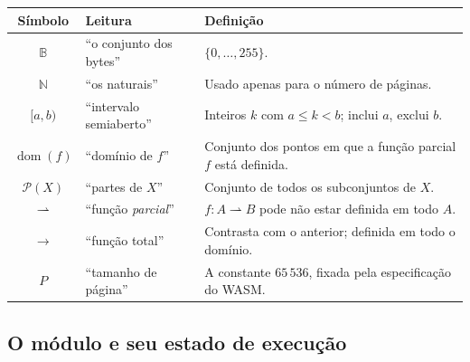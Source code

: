 \documentclass[11pt,a4paper]{article}
\theoremstyle{definition}
\begin{document}
\begin{tabularx}{\textwidth}{@{}c l X@{}}
\toprule
\textbf{Símbolo} & \textbf{Leitura} & \textbf{Definição} \\
\midrule
$\mathbb{B}$ & ``o conjunto dos bytes'' & $\{0,\dots,255\}$. \\
$\mathbb{N}$ & ``os naturais'' & Usado apenas para o número de páginas. \\
$[a,b)$ & ``intervalo semiaberto'' & Inteiros $k$ com $a \le k < b$; inclui $a$, exclui $b$. \\
$\operatorname{dom}(f)$ & ``domínio de $f$'' & Conjunto dos pontos em que a função parcial $f$ está definida. \\
$\mathcal{P}(X)$ & ``partes de $X$'' & Conjunto de todos os subconjuntos de $X$. \\
$\rightharpoonup$ & ``função \emph{parcial}'' & $f : A \rightharpoonup B$ pode não estar definida em todo $A$. \\
$\to$ & ``função total'' & Contrasta com o anterior; definida em todo o domínio. \\
$P$ & ``tamanho de página'' & A constante $65\,536$, fixada pela especificação do WASM. \\
\bottomrule
\end{tabularx}

\subsection{O módulo e seu estado de execução}
\end{document}
